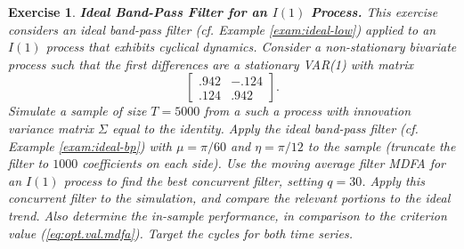 \documentclass[a4paper]{book}
\newtheorem{Exercise}{Exercise}
\begin{document}
\begin{Exercise} {\bf Ideal Band-Pass Filter for an $I(1)$ Process.} \rm
\label{exer:bandpass.i1-mdfa}
This exercise considers   an ideal band-pass filter
 (cf. Example \ref{exam:ideal-low}) 
 applied to an $I(1)$ process that exhibits cyclical dynamics.
Consider a non-stationary bivariate  process such that the first differences
 are a stationary VAR(1) with matrix
\[
    \left[ \begin{array}{ll} .942 & -.124 \\ .124 & .942 \end{array} \right].
\]
  Simulate a sample of size $T=5000$ from a
 such a process with innovation variance matrix
  $\Sigma$ equal to the identity.  
      Apply the   ideal band-pass filter (cf. Example \ref{exam:ideal-bp}) with 
  $\mu = \pi/60$ and $\eta = \pi/12$ 
    to the sample (truncate the filter to $1000$ coefficients on each side).  
 Use the moving average filter  MDFA  for an $I(1)$ process  to find the best
 concurrent filter, setting $q= 30$. 
   Apply this concurrent filter 
 to the simulation, and compare the relevant portions to the ideal trend.
 Also determine the in-sample performance, in comparison to the criterion value
 (\ref{eq:opt.val.mdfa}).   Target the cycles for both time series.
\end{Exercise}
\end{document}
